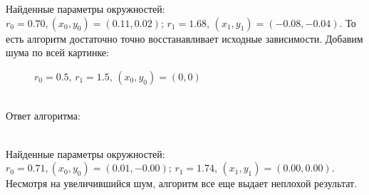 \documentclass[12pt,twoside]{article}
\begin{document}
Найденные параметры окружностей: $r_0 = 0.70, (x_0, y_0) = (0.11, 0.02); \, r_1 = 1.68, \, (x_1, y_1) = (-0.08, -0.04)$. То есть алгоритм достаточно точно восстанавливает исходные зависимости.
\newpage
Добавим шума по всей картинке: \\
\begin{figure}[h]
\caption{$r_0 = 0.5, \, r_1 = 1.5, \, (x_0, y_0) = (0, 0)$}
\end{figure} \\
Ответ алгоритма: \\
\begin{figure}[h]
\end{figure}\\
Найденные параметры окружностей: $r_0 = 0.71, (x_0, y_0) = (0.01, -0.00); \, r_1 = 1.74, \, (x_1, y_1) = (0.00, 0.00)$.  Несмотря на увеличившийся шум, алгоритм все еще выдает неплохой результат. \newpage
\end{document}

